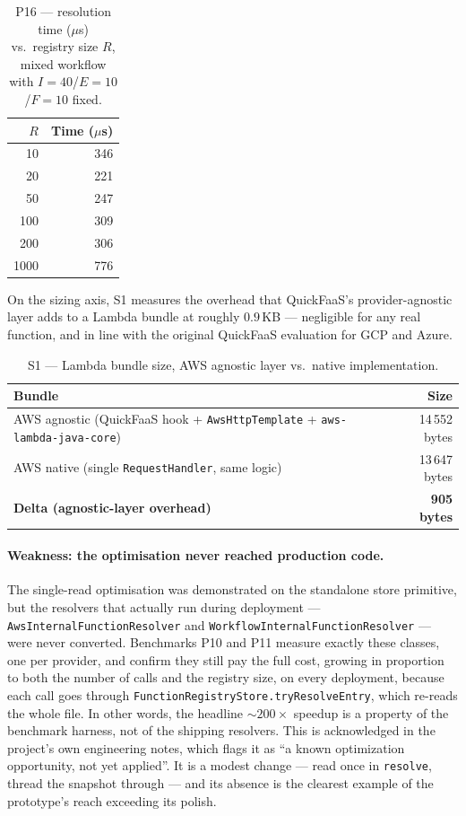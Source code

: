 \begin{table}[htbp]
  \centering
  \caption{P16 --- resolution time (\(\mu\)s) vs.\ registry size $R$, mixed workflow with
  $I{=}40$/$E{=}10$/$F{=}10$ fixed.}
  \label{tab:eval-p16}
  \begin{tabular}{rr}
    \hline
    \textbf{$R$} & \textbf{Time (\(\mu\)s)} \\
    \hline
    10   & 346 \\
    20   & 221 \\
    50   & 247 \\
    100  & 309 \\
    200  & 306 \\
    1000 & 776 \\
    \hline
  \end{tabular}
\end{table}

On the sizing axis, S1 measures the overhead that QuickFaaS's provider-agnostic layer adds to a
Lambda bundle at roughly $0.9$\,KB --- negligible for any real function, and in line
with the original QuickFaaS evaluation for GCP and Azure.

\begin{table}[htbp]
  \centering
  \caption{S1 --- Lambda bundle size, AWS agnostic layer vs.\ native implementation.}
  \label{tab:eval-s1}
  \begin{tabular}{lr}
    \hline
    \textbf{Bundle} & \textbf{Size} \\
    \hline
    AWS agnostic (QuickFaaS hook + \texttt{AwsHttpTemplate} + \texttt{aws-lambda-java-core}) & 14\,552 bytes \\
    AWS native (single \texttt{RequestHandler}, same logic) & 13\,647 bytes \\
    \textbf{Delta (agnostic-layer overhead)} & \textbf{905 bytes} \\
    \hline
  \end{tabular}
\end{table}

\paragraph{Weakness: the optimisation never reached production code.}
The single-read optimisation was demonstrated on the standalone store primitive, but the
resolvers that actually run during deployment --- \texttt{AwsInternalFunctionResolver} and
\texttt{WorkflowInternalFunctionResolver} --- were never converted. Benchmarks P10 and P11
measure exactly these classes, one per provider, and confirm they still pay the full cost,
growing in proportion to
both the number of calls and the registry size, on every deployment, because each call goes
through \texttt{FunctionRegistryStore.tryResolveEntry}, which re-reads the whole file. In other
words, the headline \(\sim\!200\times\) speedup is a property
of the benchmark harness, not of the shipping resolvers. This is acknowledged in the project's
own engineering notes, which flags it as ``a known optimization opportunity, not yet applied''.
It is a modest change --- read once in \texttt{resolve}, thread the snapshot through --- and its
absence is the clearest example of the prototype's reach exceeding its polish.

